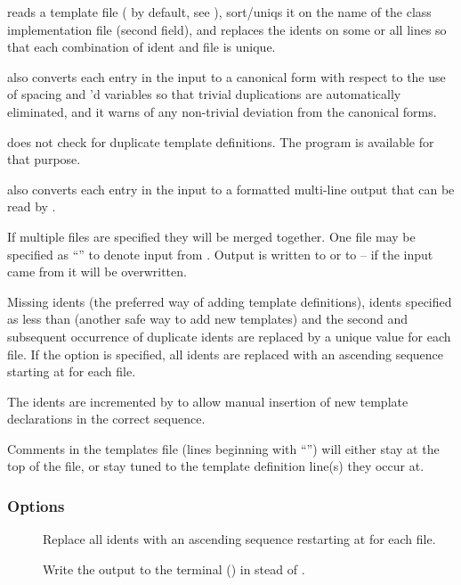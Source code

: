  reads a template file ( by default, see
), sort/uniqs it on the name of the class implementation
 file (second field), and replaces the idents on some or all lines
so that each combination of ident and  file is unique.

\noindent {} also converts each entry in the input to a canonical
form with respect to the use of spacing and 'd variables so
that trivial duplications are automatically eliminated, and it warns of any
non-trivial deviation from the canonical forms.

\noindent {} does not check for duplicate template definitions. The
 program is available for that purpose.

\noindent {} also converts each entry in the input to a formatted
multi-line output that can be read by .

If multiple files are specified they will be merged together.  One file may
be specified as ``\file{-}'' to denote input from .  Output is
written to  or to  -- if the input came from
 it will be overwritten.

Missing idents (the preferred way of adding template definitions), 
idents specified as less than  (another safe way to add new
templates) and the second and subsequent occurrence of
duplicate idents are replaced by a unique value for each  file.  If
the  option is specified, all idents are replaced with an ascending
sequence starting at  for each  file.

The idents are incremented by  to allow manual insertion of new
template declarations in the correct sequence.

Comments in the templates file (lines beginning with ``\code{\#}'') will
either stay at the top of the file, or stay tuned to the template definition
line(s) they occur at.

\subsubsection*{Options}

\begin{description}
\item[]
   Replace all idents with an ascending sequence restarting at  for
   each  file.
\item[]
   Write the output to the terminal () in stead of
   . 
\end{description}

